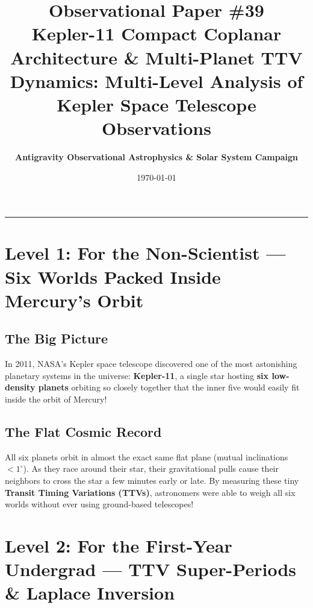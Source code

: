 \documentclass[11pt,a4paper]{article}
\title{\Huge \textbf{Observational Paper \#39}\\ \Large Kepler-11 Compact Coplanar Architecture \& Multi-Planet TTV Dynamics: Multi-Level Analysis of Kepler Space Telescope Observations}
\author{\textbf{Antigravity Observational Astrophysics \& Solar System Campaign}}
\date{\today}
\begin{document}
\maketitle

\vspace{-1em}
\begin{center}
\rule{\textwidth}{1.5pt}
\end{center}

\section*{Level 1: For the Non-Scientist — Six Worlds Packed Inside Mercury's Orbit}

\subsection*{The Big Picture}
In 2011, NASA's Kepler space telescope discovered one of the most astonishing planetary systems in the universe: \textbf{Kepler-11}, a single star hosting \textbf{six low-density planets} orbiting so closely together that the inner five would easily fit inside the orbit of Mercury!

\subsection*{The Flat Cosmic Record}
All six planets orbit in almost the exact same flat plane (mutual inclinations $< 1^\circ$). As they race around their star, their gravitational pulls cause their neighbors to cross the star a few minutes early or late. By measuring these tiny \textbf{Transit Timing Variations (TTVs)}, astronomers were able to weigh all six worlds without ever using ground-based telescopes!

\newpage

\section*{Level 2: For the First-Year Undergrad — TTV Super-Periods \& Laplace Inversion}
\end{document}
